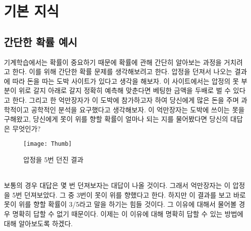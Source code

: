 \documentclass[a4paper]{oblivoir}
\begin{document}
\section{기본 지식}
\subsection{간단한 확률 예시}

기계학습에서는 확률이 중요하기 때문에 확률에 관해 간단히 알아보는 과정을 거치려고 한다. 이를 위해 간단한 확률 문제를 생각해보려고 한다. 압정을 던져서 나오는 결과에 따라 돈을 따는 도박 사이트가 있다고 생각을 해보자. 이 사이트에서는 압정의 못 부분이 위로 갈지 아래로 갈지 정확히 예측해 맞춘다면 베팅한 금액을 두배로 벌 수 있다고 한다. 그리고 한 억만장자가 이 도박에 참가하고자 하여 당신에게 많은 돈을 주며 과학적이고 공학적인 분석을 요구했다고 생각해보자. 이 억만장자는 도박에 쓰이는 못을 구해왔고, 당신에게 못이 위를 향할 확률이 얼마나 되는 지를 물어봤다면 당신의 대답은 무엇인가?\\
\begin{figure}[ht]\centering
\texttt{[image: Thumb]}\caption{압정을 5번 던진 결과}\label{Fig:1-16}
\end{figure}\\
\indent 보통의 경우 대답은 몇 번 던져보자는 대답이 나올 것이다. 그래서 억만장자는 이 압정을 5번 던져보았다. 그 중 3번이 못이 위를 향했다고 한다. 하지만 이 결과를 보고 바로 못이 위를 향할 확률이 3/5라고 말을 하기는 힘들 것이다. 그 이유에 대해서 물어볼 경우 명확히 답할 수 없기 때문이다. 이제는 이 이유에 대해 명확히 답할 수 있는 방법에 대해 알아보도록 하겠다.\\
\end{document}
